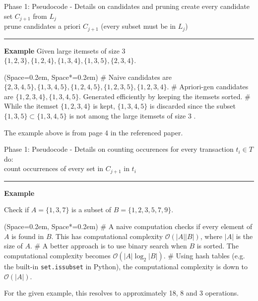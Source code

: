 \documentclass[12pt, aspectratio=1610]{beamer}
\newcommand{\listSpace}{0.2em}
\theoremstyle{plain}
\begin{document}
\begin{frame}[fragile]{Phase 1: Pseudocode - Details on candidates and pruning}
	\hspace*{1em} create every candidate set $C_{j+ 1}$ from $L_j$ \\
	\hspace*{1em} prune candidates a priori $C_{j+ 1}$ (every subset must be in $L_j$) \\ \vspace*{0.5em} \hrule \vspace*{0.5em}
	\textbf{Example}
	Given large itemsets of size 3 
	$\{1, 2, 3\}, \{1, 2, 4\}, \{1, 3, 4\}, \{1, 3, 5\}, \{2, 3, 4\}$.
	
	\begin{easylist}[itemize]
		\ListProperties(Space=\listSpace, Space*=\listSpace)
		# Naive candidates are $\{2, 3, 4, 5\}, \{1, 3, 4, 5\}, \{1, 2, 4, 5\}, \{1, 2, 3, 5\}, \{1, 2, 3, 4\}$.
		# Apriori-gen candidates are $\{1, 2, 3, 4\}, \{1, 3, 4, 5\}$.
		Generated efficiently by keeping the itemsets sorted.
		# While the itemset $\{1, 2, 3, 4\}$ is kept, $\{1, 3, 4, 5\}$ is discarded since the subset $\{1, 3, 5\} \subset \{1, 3, 4, 5\}$ is not among the large itemsets of size 3 .
	\end{easylist}
	\vfill
	{\footnotesize The example above is from page 4 in the referenced paper.}
\end{frame}

\begin{frame}[fragile]{Phase 1: Pseudocode - Details on counting occurences}
	\hspace*{1em} for every transaction $t_i \in T$ do: \\
	\hspace*{2em} count occurrences of every set in $C_{j+ 1}$ in $t_i$   \\ \vspace*{0.5em} \hrule \vspace*{0.5em}
	\textbf{Example}
	
	Check if $A = \{1, 3, 7\}$ is a subset of $B = \{1, 2, 3, 5, 7, 9\}$.

	\begin{easylist}[itemize]
		\ListProperties(Space=\listSpace, Space*=\listSpace)
		# A naive computation checks if every element of $A$ is found in $B$. This has computational complexity $\mathcal{O}(|A| |B|)$, where $|A|$ is the size of $A$.
		# A better approach is to use binary search when $B$ is sorted.
		The computational complexity becomes $\mathcal{O}(|A| \log_2 |B|)$.
		# Using hash tables (e.g. the built-in \texttt{set.issubset} in Python), the computational complexity is down to $\mathcal{O}(|A|)$.
	\end{easylist}
	For the given example, this resolves to approximately 18, 8 and 3 operations.
\end{frame}
\end{document}
